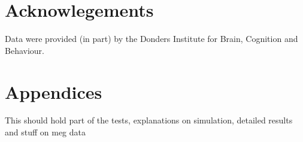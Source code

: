 \documentclass{article}
\begin{document}
\section{Acknowlegements}
Data were provided (in part) by the Donders Institute for Brain, Cognition and Behaviour.

\clearpage
\newpage




\section{Appendices}

This should hold part of the tests, explanations on simulation, detailed results and stuff on meg data
\end{document}
